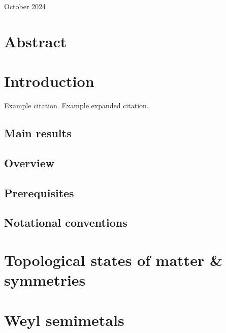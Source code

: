 \documentclass[11pt,a4paper]{report}
\theoremstyle{definition}
\theoremstyle{remark}
\newcommand{\?}{\stackrel{?}{=}}
\begin{document}
\begin{titlepage}
		\vfill\vfill\vfill %
		
		{\large October 2024} %
		
		
		\vfill %
		
	\end{titlepage}
\setcounter{page}{2}
	
	
\chapter*{Abstract}
	
\tableofcontents
	
\newpage
{}
	
\chapter{Introduction}

Example citation.\cite{einstein_rel} Example expanded citation.\parencite[Theorem 5.6]{lee_manifolds}

\section{Main results}

\section{Overview}

\section{Prerequisites}

\section{Notational conventions}
	
	
\chapter[Topological states of matter]{Topological states of matter \& symmetries}	

	
\chapter{Weyl semimetals}
\end{document}
